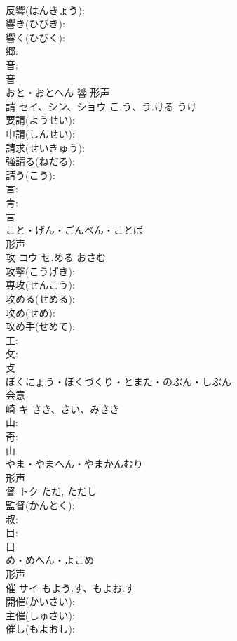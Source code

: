 \documentclass[8pt]{extreport}
\begin{document}
\begin{CJK}{UTF8}{min}
\\	反響(はんきょう): 
\\	響き(ひびき): 
\\	響く(ひびく): 
\\	郷: 
\\	音: 
\\	音	
\\	おと・おとへん	響	形声 
\\	請	セイ、シン、ショウ	こ.う、う.ける	うけ	
\\	要請(ようせい): 
\\	申請(しんせい): 
\\	請求(せいきゅう): 
\\	強請る(ねだる): 
\\	請う(こう): 
\\	言: 
\\	青: 
\\	言	
\\	こと・げん・ごんべん・ことば	
\\	形声 
\\	攻	コウ	せ.める	おさむ	
\\	攻撃(こうげき): 
\\	専攻(せんこう): 
\\	攻める(せめる): 
\\	攻め(せめ): 
\\	攻め手(せめて): 
\\	工: 
\\	攵: 
\\	攴	
\\	ぼくにょう・ぼくづくり・とまた・のぶん・しぶん	
\\	会意 
\\	崎	キ	さき、さい、みさき		
\\	山: 
\\	奇: 
\\	山	
\\	やま・やまへん・やまかんむり	
\\	形声 
\\	督	トク		ただ, ただし	
\\	監督(かんとく): 
\\	叔: 
\\	目: 
\\	目	
\\	め・めへん・よこめ	
\\	形声 
\\	催	サイ	もよう.す、もよお.す		
\\	開催(かいさい): 
\\	主催(しゅさい): 
\\	催し(もよおし): 

\end{CJK}
\end{document}
